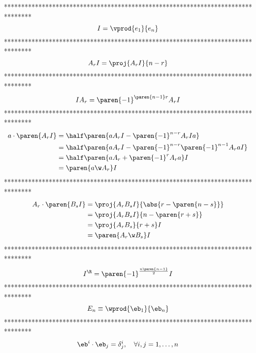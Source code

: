 ********************************************************************************
\begin{equation}\label{EQ1_47}
	I = \vprod{e_{1}}{e_{n}}
\end{equation}
********************************************************************************
\begin{equation}\label{EQ1_48}
	A_{r}I = \proj{A_{r}I}{n-r}
\end{equation}
********************************************************************************
\begin{equation}\label{EQ1_49}
	IA_{r} = \paren{-1}^{\paren{n-1}r}A_{r}I
\end{equation}
********************************************************************************
\begin{align}
	a\cdot\paren{A_{r}I} & =  \half\paren{aA_{r}I-\paren{-1}^{n-r}A_{r}Ia} \label{EQ1_50} \\
						 & =  \half\paren{aA_{r}I-\paren{-1}^{n-r}\paren{-1}^{n-1}A_{r}aI} \label{EQ1_51} \\
                         & =  \half\paren{aA_{r}+\paren{-1}^{r}A_{r}a}I \label{EQ1_52} \\
						 & = \paren{a\w A_{r}}I \label{EQ1_53}
\end{align}
********************************************************************************
\begin{align}
	A_{r}\cdot\paren{B_{s}I} & = \proj{A_{r}B_{s}I}{\abs{r-\paren{n-s}}} \label{EQ1_54} \\
							 & = \proj{A_{r}B_{s}I}{n-\paren{r+s}} \label{EQ1_55} \\
							 & = \proj{A_{r}B_{s}}{r+s}I \label{EQ1_56} \\
							 & = \paren{A_{r}\w B_{s}}I\label{EQ1_57}
\end{align}
********************************************************************************
\begin{equation}\label{EQ1_58}
	I^{\R} = \paren{-1}^{\frac{n\paren{n-1}}{2}}I
\end{equation}
********************************************************************************
\begin{equation}\label{EQ1_59}
	E_{n} \equiv \wprod{\eb_{1}}{\eb_{n}}
\end{equation}
********************************************************************************
\begin{equation}\label{EQ1_60}
	\eb^{i}\cdot \eb_{j} = \delta^{i}_{j},\quad \forall i,j = 1,\dots,n
\end{equation}
